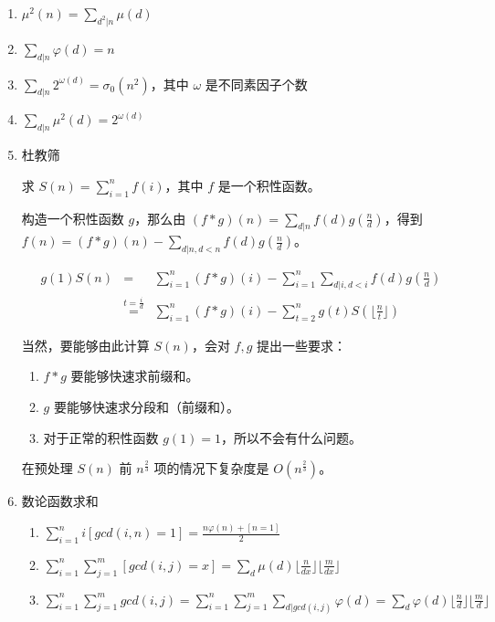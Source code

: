 \documentclass[twoside]{article}
\begin{document}
\begin{enumerate}
\item $\mu^2(n)=\sum_{d^2|n} \mu(d)​$

\item $\sum_{d|n} \varphi(d)=n$

\item $\sum_{d|n} 2^{\omega(d)}=\sigma_0(n^2)$，其中 $\omega$ 是不同素因子个数

\item $\sum_{d|n} \mu^2(d)=2^{\omega(d)}$

\item 杜教筛

求 $S(n)=\sum_{i=1}^n f(i)$，其中 $f$ 是一个积性函数。

构造一个积性函数 $g$，那么由 $(f*g)(n)=\sum_{d|n}f(d)g(\frac{n}{d})$，得到 $f(n)=(f*g)(n)-\sum_{d|n,d<n}f(d)g(\frac{n}{d})$。

\begin{eqnarray}
g(1)S(n)&=&\sum_{i=1}^n (f*g)(i)-\sum_{i= 1}^{n}\sum_{d|i,d<i}f(d)g(\frac{n}{d}) \\
&\overset{t=\frac{i}{d}}{=}& \sum_{i=1}^n (f*g)(i)-\sum_{t=2}^{n} g(t) S(\lfloor \frac{n}{t} \rfloor)
\end{eqnarray}


当然，要能够由此计算 $S(n)$，会对 $f,g$ 提出一些要求：

\begin{enumerate}
	
	\item $f*g$ 要能够快速求前缀和。
	
	\item $g$  要能够快速求分段和（前缀和）。
	
	\item 对于正常的积性函数 $g(1)=1$，所以不会有什么问题。

\end{enumerate}

在预处理 $S(n)$ 前 $n^{\frac{2}{3}}$ 项的情况下复杂度是 $O(n^{\frac{2}{3}})$。

\item 数论函数求和

\begin{enumerate}

	\item $\sum_{i=1}^n i[gcd(i, n)=1] = \frac {n \varphi(n) + [n=1]}{2}$
	
	\item $\sum_{i=1}^n \sum_{j=1}^m [gcd(i,j)=x]=\sum_d \mu(d) \lfloor \frac n {dx} \rfloor  \lfloor \frac m {dx} \rfloor$
	
	\item $\sum_{i=1}^n \sum_{j=1}^m gcd(i, j) = \sum_{i=1}^n \sum_{j=1}^m \sum_{d|gcd(i,j)} \varphi(d) = \sum_{d} \varphi(d) \lfloor \frac nd \rfloor \lfloor \frac md \rfloor$
	

\end{enumerate}
\end{enumerate}
\end{document}

